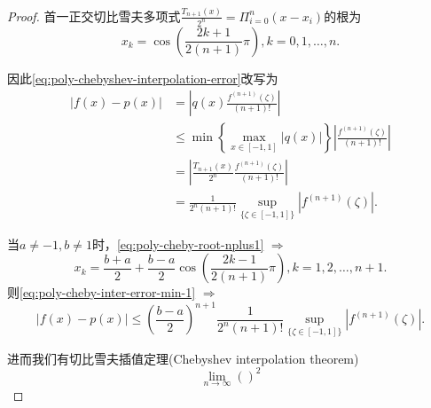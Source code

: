 \begin{subappendices}
\begin{proof}
首一正交切比雪夫多项式$\frac{T_{n+1}(x)}{2^n} = \Pi_{i=0}^{n} (x - x_i)$的根为
\begin{equation}
  \label{eq:poly-cheby-root-nplus1}
  x_k = \cos \left( \frac{2k+1}{2(n+1)} \pi \right), k = 0,1,\ldots,n.
\end{equation}

因此\eqref{eq:poly-chebyshev-interpolation-error}改写为
\begin{equation}
  \label{eq:poly-cheby-inter-error-min-1}
  \begin{split}
    \left| f(x) - p(x) \right| &= \left| q(x) \frac{f^{(n+1)}(\zeta)}{(n+1)!} \right| \\
    &\le \min \left\{ \max_{x \in [-1,1]} \left| q(x) \right| \right\}  \left| \frac{f^{(n+1)}(\zeta)}{(n+1)!} \right| \\
    &= \left| \frac{T_{n+1}(x)}{2^n} \frac{f^{(n+1)}(\zeta)}{(n+1)!} \right|\\
    &=\frac{1}{2^n (n+1)!} \sup_{\{ \zeta \in [-1,1]\} } \left| f^{(n+1)} (\zeta) \right|.
    \end{split}
\end{equation}

当$a\neq -1, b\neq 1$时，\eqref{eq:poly-cheby-root-nplus1} $\Rightarrow$
\begin{equation}
  \label{eq:poly-cheby-root-nplus1-ab}
  x_k = \frac{b+a}{2} + \frac{b-a}{2} \cos \left( \frac{2k-1}{2(n+1)} \pi \right), k = 1,2,\ldots,n+1.
\end{equation}
则\eqref{eq:poly-cheby-inter-error-min-1} $\Rightarrow$
\begin{equation}
  \left| f(x) - p(x) \right| \le \left(\frac{b-a}{2}\right)^{n+1}
  \frac{1}{2^n (n+1)!} \sup_{\{ \zeta \in [-1,1]\} } \left| f^{(n+1)} (\zeta) \right|.
\end{equation}

进而我们有切比雪夫插值定理(Chebyshev interpolation theorem)
\begin{equation}
  \label{eq:poly-cheby-interpolation-theorem}
  \lim_{n \rightarrow \infty} \left(  \right)^2
\end{equation}
\end{proof}


\end{subappendices}
